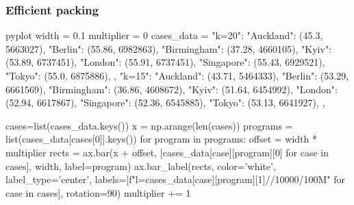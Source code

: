 \begin{frame}[fragile]
  \frametitle{Efficient packing}

  \begin{CacheMeCode}{pyplot}
    width = 0.1
    multiplier = 0
    cases_data = {
      "k=20": {
        "Auckland": (45.3, 5663027),
        "Berlin": (55.86, 6982863),
        "Birmingham": (37.28, 4660105),
        "Kyiv": (53.89, 6737451),
        "London": (55.91, 6737451),
        "Singapore": (55.43, 6929521),
        "Tokyo": (55.0, 6875886),
      },
      "k=15": {                                                                                                                                                                                                                               
        "Auckland": (43.71, 5464333),                                                                                                                                                                                                         
        "Berlin": (53.29, 6661569),                                                                                                                                                                                                           
        "Birmingham": (36.86, 4608672),                                                                                                                                                                                                       
        "Kyiv": (51.64, 6454992),                                                                                                                                                                                                             
        "London": (52.94, 6617867),                                                                                                                                                                                                           
        "Singapore": (52.36, 6545885),                                                                                                                                                                                                        
        "Tokyo": (53.13, 6641927),                                                                                                                                                                                                            
      },
    }

    cases=list(cases_data.keys())
    x = np.arange(len(cases))
    programs = list(cases_data[cases[0]].keys())
    for program in programs:
      offset = width * multiplier
      rects = ax.bar(x + offset, [cases_data[case][program][0] for case in cases], width, label=program)
      ax.bar_label(rects, color='white', label_type='center', labels=[f"l={cases_data[case][program][1]//10000/100}M" for case in cases], rotation=90)
      multiplier += 1


\end{CacheMeCode}
\end{frame}
